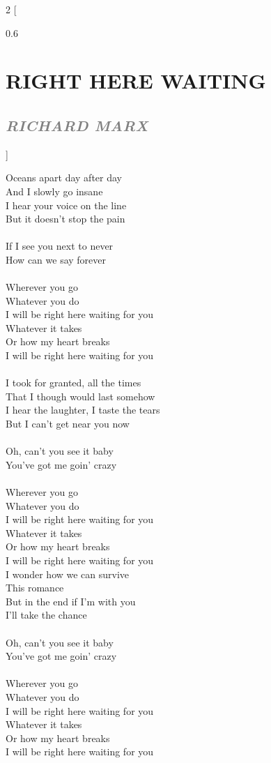 \documentclass[100pt,a4paper]{report}
\newenvironment{song2}[2]
	{	
    	\begin{multicols*}{2}
		[
			\begin{spacing}{0.6}
				\section*{\LARGE\centering \MakeUppercase{\textbf{{#1}}}}
				\subsection*{\Large\centering \textit{\textcolor{gray}{\MakeUppercase{{#2}}}}}
			\end{spacing}
		]
		\Large
	}
	{
	\end{multicols*}
	\newpage
    }
\begin{document}
\begin{song2}{RIGHT HERE WAITING}{RICHARD MARX}
\noindent
Oceans apart day after day\\
And I slowly go insane\\
I hear your voice on the line\\
But it doesn't stop the pain\\
\\
If I see you next to never\\
How can we say forever\\
\\
Wherever you go\\
Whatever you do\\
I will be right here waiting for you\\
Whatever it takes\\
Or how my heart breaks\\
I will be right here waiting for you\\
\\
I took for granted, all the times\\
That I though would last somehow\\
I hear the laughter, I taste the tears\\
But I can't get near you now\\
\\
Oh, can't you see it baby\\
You've got me goin' crazy\\
\\
Wherever you go\\
Whatever you do\\
I will be right here waiting for you\\
Whatever it takes\\
Or how my heart breaks\\
I will be right here waiting for you\\
\vfill
\columnbreak
\noindent
I wonder how we can survive\\
This romance\\
But in the end if I'm with you\\
I'll take the chance\\
\\
Oh, can't you see it baby\\
You've got me goin' crazy\\
\\
Wherever you go\\
Whatever you do\\
I will be right here waiting for you\\
Whatever it takes\\
Or how my heart breaks\\
I will be right here waiting for you 
\end{song2}
\end{document}
